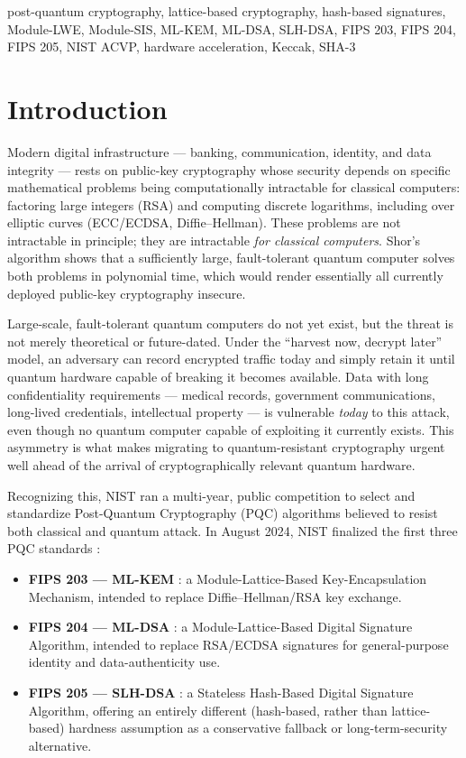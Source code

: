 \documentclass[10pt,conference]{IEEEtran}
\begin{document}
\begin{IEEEkeywords}
post-quantum cryptography, lattice-based cryptography, hash-based
signatures, Module-LWE, Module-SIS, ML-KEM, ML-DSA, SLH-DSA, FIPS 203,
FIPS 204, FIPS 205, NIST ACVP, hardware acceleration, Keccak, SHA-3
\end{IEEEkeywords}

\section{Introduction}

Modern digital infrastructure --- banking, communication, identity, and
data integrity --- rests on public-key cryptography whose security
depends on specific mathematical problems being computationally
intractable for classical computers: factoring large integers (RSA) and
computing discrete logarithms, including over elliptic curves (ECC/ECDSA,
Diffie--Hellman). These problems are not intractable in principle; they
are intractable \emph{for classical computers}. Shor's algorithm
\cite{shor1997} shows that a sufficiently large, fault-tolerant quantum
computer solves both problems in polynomial time, which would render
essentially all currently deployed public-key cryptography insecure.

Large-scale, fault-tolerant quantum computers do not yet exist, but the
threat is not merely theoretical or future-dated. Under the ``harvest
now, decrypt later'' model, an adversary can record encrypted traffic
today and simply retain it until quantum hardware capable of breaking it
becomes available. Data with long confidentiality requirements ---
medical records, government communications, long-lived credentials,
intellectual property --- is vulnerable \emph{today} to this attack, even
though no quantum computer capable of exploiting it currently exists.
This asymmetry is what makes migrating to quantum-resistant cryptography
urgent well ahead of the arrival of cryptographically relevant quantum
hardware.

Recognizing this, NIST ran a multi-year, public competition
\cite{nist-pqc} to select and standardize Post-Quantum Cryptography (PQC)
algorithms believed to resist both classical and quantum attack. In
August 2024, NIST finalized the first three PQC standards
\cite{nist-announce}:

\begin{itemize}
\item \textbf{FIPS 203 --- ML-KEM} \cite{fips203}: a Module-Lattice-Based
  Key-Encapsulation Mechanism, intended to replace Diffie--Hellman/RSA
  key exchange.
\item \textbf{FIPS 204 --- ML-DSA} \cite{fips204}: a Module-Lattice-Based
  Digital Signature Algorithm, intended to replace RSA/ECDSA signatures
  for general-purpose identity and data-authenticity use.
\item \textbf{FIPS 205 --- SLH-DSA} \cite{fips205}: a Stateless
  Hash-Based Digital Signature Algorithm, offering an entirely different
  (hash-based, rather than lattice-based) hardness assumption as a
  conservative fallback or long-term-security alternative.
\end{itemize}
\end{document}
